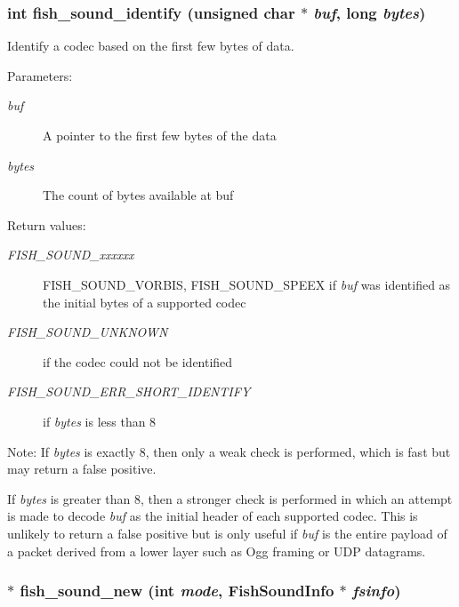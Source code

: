 \subsubsection{\setlength{\rightskip}{0pt plus 5cm}int fish\_\-sound\_\-identify (unsigned char $\ast$ {\em buf}, long {\em bytes})}\label{fishsound_8h_a3}


Identify a codec based on the first few bytes of data. 

\begin{Desc}
\item[Parameters:]
\begin{description}
\item[{\em buf}]A pointer to the first few bytes of the data \item[{\em bytes}]The count of bytes available at buf \end{description}
\end{Desc}
\begin{Desc}
\item[Return values:]
\begin{description}
\item[{\em FISH\_\-SOUND\_\-xxxxxx}]FISH\_\-SOUND\_\-VORBIS, FISH\_\-SOUND\_\-SPEEX if {\em buf\/} was identified as the initial bytes of a supported codec \item[{\em FISH\_\-SOUND\_\-UNKNOWN}]if the codec could not be identified \item[{\em FISH\_\-SOUND\_\-ERR\_\-SHORT\_\-IDENTIFY}]if {\em bytes\/} is less than 8 \end{description}
\end{Desc}
\begin{Desc}
\item[Note:]If {\em bytes\/} is exactly 8, then only a weak check is performed, which is fast but may return a false positive. 

If {\em bytes\/} is greater than 8, then a stronger check is performed in which an attempt is made to decode {\em buf\/} as the initial header of each supported codec. This is unlikely to return a false positive but is only useful if {\em buf\/} is the entire payload of a packet derived from a lower layer such as Ogg framing or UDP datagrams. \end{Desc}
\subsubsection{$\ast$ fish\_\-sound\_\-new (int {\em mode}, {\bf Fish\-Sound\-Info} $\ast$ {\em fsinfo})}\label{fishsound_8h_a4}


